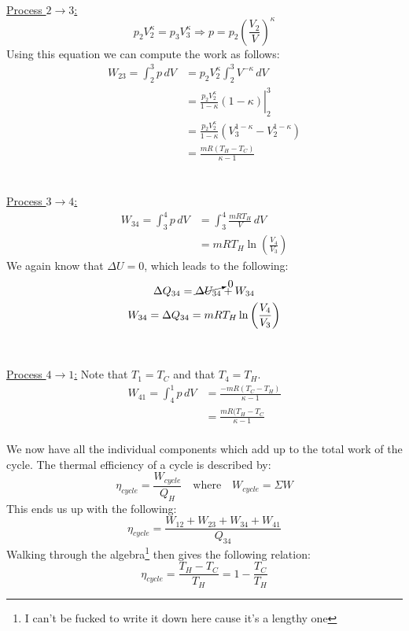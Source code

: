 \documentclass[11pt, a4paper]{article}
\begin{document}
\\
\underline{Process $2 \to 3$:}
\begin{equation}
  p_2V_2^\kappa = p_3V_3^\kappa \Rightarrow p = p_2 \left( \frac{V_2}{V} \right)^\kappa
\end{equation}
Using this equation we can compute the work as follows:
\begin{align}
  W_{23} = \int_2^3 p\,dV &= p_2V_2^\kappa \int_2^3 V^{-\kappa}\,dV\\
                          &= \left.\frac{p_2V_2^\kappa}{1 - \kappa}(1-\kappa)\right|_2^3\\
                          &= \frac{p_2V_2^\kappa}{1-\kappa}(V_3^{1-\kappa} - V_2^{1-\kappa})\\
                          &= \frac{mR(T_H - T_C)}{\kappa - 1}
\end{align}\\
\\
\underline{Process $3 \to 4$:}
\begin{align}
  W_{34} = \int_3^4 p\,dV &= \int_3^4 \frac{mRT_H}{V}\,dV\\
                          &= mRT_H \ln \left( \frac{V_4}{V_3} \right)
\end{align}
We again know that $\Delta U = 0$, which leads to the following:
\begin{gather}
  \Delta Q_{34} = \cancelto{0}{\Delta U_{34}} + W_{34}\\
  W_{34} = \Delta Q_{34} = mRT_H \ln \left( \frac{V_4}{V_3} \right)
\end{gather}\\
\\
\underline{Process $4 \to 1$:}
Note that $T_1 = T_C$ and that $T_4 = T_H$.
\begin{align}
  W_{41} = \int_4^1 p\,dV &= \frac{-mR(T_C - T_H)}{\kappa - 1}\\
                          &= \frac{mR(T_H - T_C}{\kappa - 1}
\end{align}\\
We now have all the individual components which add up to the total work of the cycle. The thermal efficiency of a cycle is described by:
\begin{equation}
  \eta_{cycle} = \frac{W_{cycle}}{Q_H} \quad \text{where} \quad W_{cycle} = \Sigma W
\end{equation}
This ends us up with the following:
\begin{equation}
  \eta_{cycle} = \frac{W_{12} + W_{23} + W_{34} + W_{41}}{Q_{34}}
\end{equation}
Walking through the algebra\footnote{I can't be fucked to write it down here cause it's a lengthy one} then gives the following relation:
\begin{equation}
  \eta_{cycle} = \frac{T_H - T_C}{T_H} = 1 - \frac{T_C}{T_H}
\end{equation}
\end{document}
